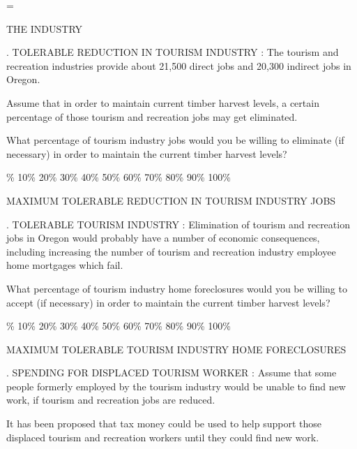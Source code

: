 
\nopagenumbers
\headline={\hfill}
\twelvepoint 
\centerline{\twlbf THE  INDUSTRY}
\bigskip\bigskip\par\noindent
{. TOLERABLE REDUCTION IN TOURISM INDUSTRY :} 
The tourism and recreation industries provide about 21,500 direct jobs and 
20,300 indirect jobs in Oregon.
\medskip\par\noindent
Assume that in order to maintain current timber harvest levels, a certain 
percentage of those tourism and recreation jobs may get eliminated.
\medskip\par\noindent
What percentage of tourism industry jobs would you be willing to eliminate (if
necessary) in order to maintain the current timber harvest levels?
\medskip\par{}\% \hfill 10\% \hfill 20\% \hfill 30\% \hfill 40\% \hfill 50\% \hfill 60\% \hfill 
70\% \hfill 80\% \hfill 90\% \hfill 100\%
\medskip\par\noindent
\centerline{MAXIMUM TOLERABLE REDUCTION IN TOURISM INDUSTRY JOBS}
\bigskip\bigskip\par\noindent
{. TOLERABLE TOURISM INDUSTRY 
:}\break
Elimination of tourism and recreation jobs in Oregon would probably have 
a number of economic consequences, including increasing the number of 
tourism and recreation industry employee home mortgages which fail. 
\medskip\par\noindent
What percentage of tourism industry home foreclosures would you be willing to 
accept (if necessary) in order to maintain the current timber harvest levels?
\medskip\par{}\% \hfill 10\% \hfill 20\% \hfill 30\% \hfill 40\% \hfill 50\% \hfill 60\% 
\hfill 70\% \hfill 80\% \hfill 90\% \hfill 100\%
\medskip\par\noindent
\centerline{MAXIMUM TOLERABLE TOURISM INDUSTRY HOME FORECLOSURES}
\bigskip\bigskip\par\noindent
{. SPENDING FOR DISPLACED TOURISM WORKER :}
Assume that some people formerly employed by the tourism industry would
be unable to find new work, if tourism and recreation jobs are reduced.
\medskip\par\noindent
It has been proposed that tax money could be used to help support those 
displaced tourism and recreation workers until they could find new work. 
